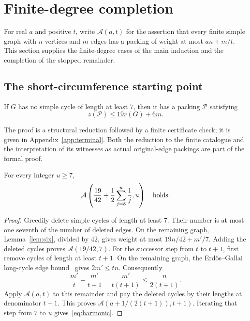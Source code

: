 \section{Finite-degree completion}\label{sec:finite}
For real $a$ and positive $t$, write $\mathcal A(a,t)$ for the assertion
that every finite simple graph with $n$ vertices and $m$ edges has a packing
of weight at most $an+m/t$. This section supplies the finite-degree cases
of the main induction and the completion of the stopped remainder.

\subsection{The short-circumference starting point}
\begin{lemma}\label{lem:six}
If $G$ has no simple cycle of length at least $7$, then it has a packing
$\mathcal P$ satisfying
\[
                  z(\mathcal P)\le19r(G)+6m.
\]
\end{lemma}
The proof is a structural reduction followed by a finite certificate check;
it is given in Appendix~\ref{app:terminal}. Both the reduction to the finite
catalogue and the interpretation of its witnesses as actual original-edge
packings are part of the formal proof.

\begin{lemma}\label{lem:harmonic}
For every integer $u\ge7$,
\begin{equation}\label{eq:harmonic}
 \mathcal A\left(\frac{19}{42}+\frac12\sum_{j=8}^u\frac1j,u\right)
 \quad\hbox{holds}.
\end{equation}
\end{lemma}
\begin{proof}
Greedily delete simple cycles of length at least $7$. Their number is at
most one seventh of the number of deleted edges. On the remaining graph,
Lemma~\ref{lem:six}, divided by $42$, gives weight at most
$19n/42+m'/7$. Adding the deleted cycles proves $\mathcal A(19/42,7)$.
For the successor step from $t$ to $t+1$, first remove cycles of length at
least $t+1$. On the remaining graph, the Erd\H{o}s--Gallai long-cycle edge
bound~\cite{EG1959} gives $2m'\le tn$. Consequently
\[
 \frac{m'}t-\frac{m'}{t+1}
          =\frac{m'}{t(t+1)}\le\frac{n}{2(t+1)}.
\]
Apply $\mathcal A(a,t)$ to this remainder and pay the deleted cycles by
their lengths at denominator $t+1$. This proves
$\mathcal A(a+1/(2(t+1)),t+1)$.
Iterating that step from $7$ to $u$ gives~\eqref{eq:harmonic}.
\end{proof}

